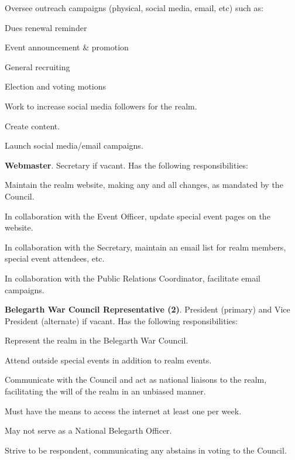 \documentclass[12pt]{article}
\begin{document}
\begin{level}
\begin{level}
\begin{level}
        \item Oversee outreach campaigns (physical, social media, email, etc) such as:
        \begin{level}
            \item Dues renewal reminder
            \item Event announcement \& promotion
            \item General recruiting
            \item Election and voting motions
        \end{level}
        \item Work to increase social media followers for the realm.
        \item {}
        \begin{level}
            \item Create content.
            \item Launch social media/email campaigns.
        \end{level}
    \end{level}
    \item \textbf{Webmaster}. Secretary if vacant. Has the following responsibilities:
    \begin{level}
        \item Maintain the realm website, making any and all changes, as mandated by the Council.
        \item In collaboration with the Event Officer, update special event pages on the website.
        \item In collaboration with the Secretary, maintain an email list for realm members, special event attendees, etc.
        \item In collaboration with the Public Relations Coordinator, facilitate email campaigns.
        \item {}
    \end{level}
    \item \textbf{Belegarth War Council Representative (2)}. President (primary) and Vice President (alternate) if vacant. Has the following responsibilities:
    \begin{level}
        \item Represent the realm in the Belegarth War Council.
        \item Attend outside special events in addition to realm events.
        \item Communicate with the Council and act as national liaisons to the realm, facilitating the will of the realm in an unbiased manner.
        \item Must have the means to access the internet at least one per week.
        \item May not serve as a National Belegarth Officer.
        \item Strive to be respondent, communicating any abstains in voting to the Council.
    \end{level}
\end{level}

\end{level}
\end{document}
